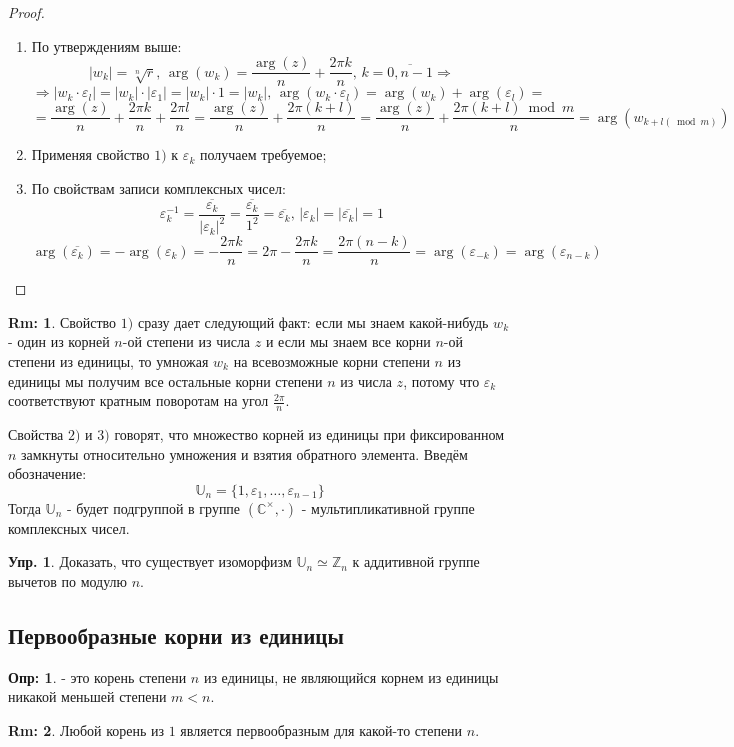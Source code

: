 \documentclass[12pt]{article}
\newcommand{\MC}{\mathbb{C}}
\newcommand{\MZ}{\mathbb{Z}}
\newcommand{\VE}{\varepsilon}
\theoremstyle{definition}
\newtheorem{defn}{Опр:}
\newtheorem{rem}{Rm:}
\newtheorem{exrc}{Упр.}
\newcommand{\ovl}[1]{\overline{#1}}
\begin{document}
\begin{proof}\hfill
	\begin{enumerate}[label=\arabic*)]
		\item По утверждениям выше:
		$$
			|w_k| = \sqrt[n]{r}, \, \arg(w_k) = \dfrac{\arg(z)}{n} + \dfrac{2\pi k}{n}, \, k = \overline{0,n-1} \Rightarrow
		$$
		$$
			\Rightarrow |w_k{\cdot}\VE_l| = |w_k|{\cdot}|\VE_1| = |w_k|{\cdot}1 = |w_k|, \, \arg(w_k{\cdot}\VE_l) = \arg(w_k) + \arg(\VE_l) = 
		$$
		$$
			= \dfrac{\arg(z)}{n} + \dfrac{2\pi k}{n} + \dfrac{2\pi l}{n} = \dfrac{\arg(z)}{n} + \dfrac{2\pi (k + l)}{n} = \dfrac{\arg(z)}{n} + \dfrac{2\pi (k + l) \bmod m}{n} = \arg(w_{k + l(\bmod{m})})
		$$
		\item Применяя свойство $1)$ к $\VE_k$ получаем требуемое;
		\item По свойствам записи комплексных чисел:
		$$
			\VE_k^{-1} = \dfrac{\ovl{\VE_k}}{|\VE_k|^2} = \dfrac{\ovl{\VE_k}}{1^2} = \ovl{\VE_k},\, |\VE_k| = |\ovl{\VE_k}| = 1
		$$
		$$	
			\arg(\ovl{\VE_k}) = - \arg(\VE_k) = - \dfrac{2\pi k}{n} = 2\pi - \dfrac{2\pi k}{n} = \dfrac{2\pi (n -k)}{n} = \arg(\VE_{-k}) = \arg(\VE_{n-k})
		$$
	\end{enumerate}
\end{proof}
\begin{rem}
	Свойство $1)$ сразу дает следующий факт: если мы знаем какой-нибудь $w_k$ - один из корней $n$-ой степени из числа $z$ и если мы знаем все корни $n$-ой степени из единицы, то умножая $w_k$ на всевозможные корни степени $n$ из единицы мы получим все остальные корни степени $n$ из числа $z$, потому что $\VE_k$ соответствуют кратным поворотам на угол $\tfrac{2\pi}{n}$.
\end{rem}

Свойства $2)$ и $3)$ говорят, что множество корней из единицы при фиксированном $n$ замкнуты относительно умножения и взятия обратного элемента. Введём обозначение:
$$
	\mathbb{U}_n = \{1, \VE_1,\dotsc, \VE_{n-1}\}
$$
Тогда $\mathbb{U}_n$ - будет подгруппой в группе $(\MC^{\times}, \cdot)$ - мультипликативной группе комплексных чисел.
\begin{exrc}
	Доказать, что существует изоморфизм $\mathbb{U}_n \simeq \MZ_n$ к аддитивной группе вычетов по модулю $n$.
\end{exrc}
\newpage
\subsection*{Первообразные корни из единицы}
\begin{defn}
	 - это корень степени $n$ из единицы, не являющийся корнем из единицы никакой меньшей степени $m < n$.
\end{defn}
\begin{rem}
	Любой корень из $1$ является первообразным для какой-то степени $n$.
\end{rem}
\end{document}
